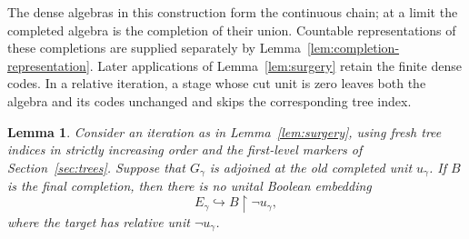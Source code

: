 \documentclass[11pt]{article}
\newtheorem{lemma}[theorem]{Lemma}
\theoremstyle{definition}
\theoremstyle{remark}
\newcommand{\restr}{\mathbin{\upharpoonright}}
\begin{document}
The dense algebras in this construction form the continuous chain; at a
limit the completed algebra is the completion of their union.  Countable
representations of these completions are supplied separately by
Lemma~\ref{lem:completion-representation}.  Later applications of
Lemma~\ref{lem:surgery} retain the finite dense codes.  In a relative
iteration, a stage whose cut unit is zero leaves both the algebra and
its codes unchanged and skips the corresponding tree index.

\begin{lemma}\label{lem:complementary-omission}
Consider an iteration as in Lemma~\ref{lem:surgery}, using fresh tree
indices in strictly increasing order and the first-level markers of
Section~\ref{sec:trees}.  Suppose that $G_\gamma$ is adjoined at the old
completed unit $u_\gamma$.  If $B$ is the final completion, then there is
no unital Boolean embedding
\[
 E_\gamma\hookrightarrow B\restr\neg u_\gamma,
\]
where the target has relative unit $\neg u_\gamma$.
\end{lemma}
\end{document}
